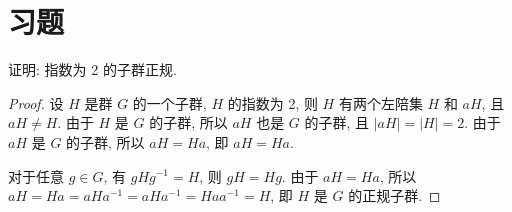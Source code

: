 
    \section{}

    \section{习题}  

        \begin{example}
            证明: 指数为 2 的子群正规.
        \end{example}
        \begin{proof}
            设 $H$ 是群 $G$ 的一个子群, $H$ 的指数为 2, 则 $H$ 有两个左陪集 $H$ 和 $aH$, 且 $aH \neq H$. 由于 $H$ 是 $G$ 的子群, 所以 $aH$ 也是 $G$ 的子群, 且 $|aH| = |H| = 2$. 由于 $aH$ 是 $G$ 的子群, 所以 $aH = Ha$, 即 $aH = Ha$.

            对于任意 $g \in G$, 有 $gHg^{-1} = H$, 则 $gH = Hg$. 由于 $aH = Ha$, 所以 $aH = Ha = aHa^{-1} = aHa^{-1} = Haa^{-1} = H$, 即 $H$ 是 $G$ 的正规子群.
        \end{proof}